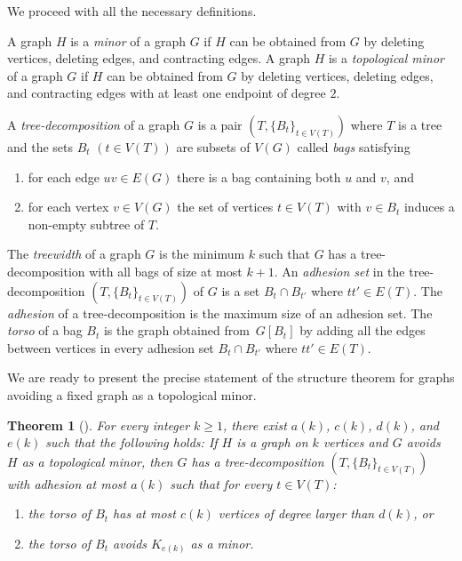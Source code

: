 \documentclass[11pt]{article}
\newtheorem{theorem}{Theorem}
\begin{document}
We proceed with all the necessary definitions.

A graph $H$ is a \emph{minor} of a graph $G$ if $H$ can be obtained from $G$ by 
deleting vertices, deleting edges, and contracting edges. 
A graph $H$ is a \emph{topological minor} of a graph $G$ if $H$ can be obtained 
from $G$ by deleting vertices, deleting edges, and contracting edges with 
at least one endpoint of degree $2$.


A \emph{tree-decomposition} of a graph $G$ is a pair $(T,\{B_t\}_{t\in V(T)})$ 
where $T$ is a tree and the sets $B_t$ $(t\in V(T))$ are subsets of $V(G)$ 
called \emph{bags} satisfying
\begin{enumerate}[nosep]
\item for each edge $uv\in E(G)$ there is a bag containing both $u$ and $v$, and
\item for each vertex $v\in V(G)$ the set of vertices $t\in V(T)$ with 
$v\in B_t$  induces a non-empty subtree of $T$.
\end{enumerate}
The \emph{treewidth} of a graph $G$ is the minimum $k$ such that
$G$ has a tree-decomposition with all bags of size at most $k+1$.
An \emph{adhesion set} in the tree-decomposition $(T,\{B_t\}_{t\in V(T)})$ 
of $G$ is a set $B_t \cap B_{t'}$ where $tt'\in E(T)$.
The \emph{adhesion} of a tree-decomposition is the maximum size of an adhesion set.
The \emph{torso} of a bag $B_t$ is the graph obtained from~$G[B_t]$ by adding all 
the edges between vertices in every adhesion set $B_t \cap B_{t'}$
where $tt'\in E(T)$.

We are ready to present the precise statement of the structure theorem for graphs avoiding 
a fixed graph as a topological minor.
\begin{theorem}[\cite{GM15}]\label{thm-structure-theorem}
For every integer $k\geq1$, there exist $a(k)$, $c(k)$, 
$d(k)$, and $e(k)$ such that the following holds:
If $H$ is a graph on $k$ vertices and 
$G$ avoids $H$ as a topological minor,
then $G$ has a tree-decomposition $(T,\{B_t\}_{t\in V(T)})$ with 
adhesion at most $a(k)$ such that for every $t\in V(T)$:
\begin{enumerate}[label=\textup{(\roman*)},nosep]
\item the torso of $B_t$ has at most $c(k)$ vertices of degree larger than $d(k)$, or
\item the torso of $B_t$ avoids $K_{e(k)}$ as a minor.
\end{enumerate}
\end{theorem}
\end{document}

